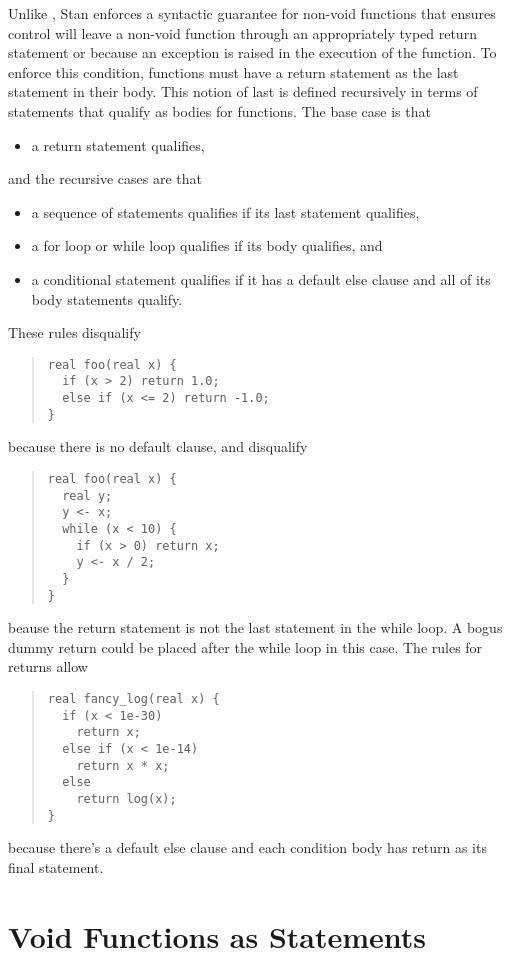 Unlike \Cpp, Stan enforces a syntactic guarantee for non-void
functions that ensures control will leave a non-void function through
an appropriately typed return statement or because an exception is
raised in the execution of the function.  To enforce this condition,
functions must have a return statement as the last statement in their
body.  This notion of last is defined recursively in terms of
statements that qualify as bodies for functions.  The base case is that
%
\begin{itemize}
\item a return statement qualifies,
\end{itemize}
%
and the recursive cases are that
%
\begin{itemize}
\item a sequence of statements qualifies if its last statement
  qualifies,
\item a for loop or while loop qualifies if its body qualifies, and
\item a conditional statement qualifies if it has a default else
  clause and all of its body statements qualify.
\end{itemize}
%
These rules disqualify
%
\begin{quote}
\begin{Verbatim}
real foo(real x) {
  if (x > 2) return 1.0;
  else if (x <= 2) return -1.0;
}
\end{Verbatim}
\end{quote}
%
because there is no default  clause, and 
disqualify
%
\begin{quote}
\begin{Verbatim}
real foo(real x) {
  real y;
  y <- x;
  while (x < 10) {
    if (x > 0) return x;
    y <- x / 2;
  }
}
\end{Verbatim}
\end{quote}
%
beause the return statement is not the last statement in the while
loop.  A bogus dummy return could be placed after the while loop in
this case.  The rules for returns allow
%
\begin{quote}
\begin{Verbatim}
real fancy_log(real x) {
  if (x < 1e-30)
    return x;
  else if (x < 1e-14)
    return x * x;
  else
    return log(x);
}
\end{Verbatim}
\end{quote}
%
because there's a default else clause and each condition body has
return as its final statement.


\section{Void Functions as Statements}

